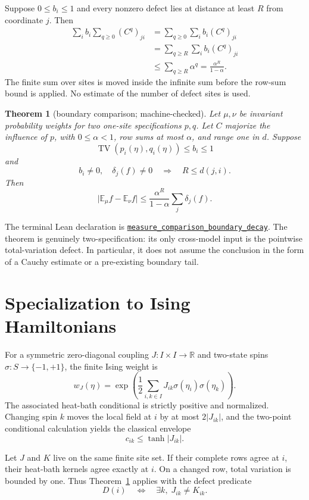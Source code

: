 \documentclass[11pt]{article}
\newtheorem{theorem}{Theorem}[section]
\theoremstyle{definition}
\newcommand{\R}{\mathbb R}
\newcommand{\E}{\mathbb E}
\newcommand{\TV}{\operatorname{TV}}
\newcommand{\abs}[1]{\lvert #1\rvert}
\newcommand{\sourceanchor}{f587b35001f4ae87c7fe0383662864df6bc9a1c0}
\newcommand{\leanline}[3]{%
  \href{https://github.com/lluiseriksson/THE-ERIKSSON-PROGRAMME/blob/\sourceanchor/YangMills/OS/#1.lean\#L#2}{\nolinkurl{#3}}}
\begin{document}
Suppose $0\le b_i\le1$ and every nonzero defect lies at distance at least $R$
from coordinate $j$.  Then
\begin{align*}
  \sum_i b_i\sum_{q\ge0}(C^q)_{ji}
  &=\sum_{q\ge0}\sum_i b_i(C^q)_{ji}\\
  &=\sum_{q\ge R}\sum_i b_i(C^q)_{ji}\\
  &\le\sum_{q\ge R}\alpha^q
   =\frac{\alpha^R}{1-\alpha}.
\end{align*}
The finite sum over sites is moved inside the infinite sum before the row-sum
bound is applied.  No estimate of the number of defect sites is used.

\begin{theorem}[boundary comparison; machine-checked]
\label{thm:abstract-boundary}
Let $\mu,\nu$ be invariant probability weights for two one-site
specifications $p,q$.  Let $C$ majorize the influence of $p$, with
$0\le\alpha<1$, row sums at most $\alpha$, and range one in $d$.  Suppose
\[
  \TV(p_i(\eta),q_i(\eta))\le b_i\le1
\]
and
\[
  b_i\ne0,\quad\delta_j(f)\ne0
  \quad\Longrightarrow\quad R\le d(j,i).
\]
Then
\[
  \abs{\E_\mu f-\E_\nu f}
  \le\frac{\alpha^R}{1-\alpha}\sum_j\delta_j(f).
\]
\end{theorem}

The terminal Lean declaration is
\leanline{DobrushinMeasureComparison}{488}{measure_comparison_boundary_decay}.
The theorem is genuinely two-specification: its only cross-model input is the
pointwise total-variation defect.  In particular, it does not assume the
conclusion in the form of a Cauchy estimate or a pre-existing boundary tail.

\section{Specialization to Ising Hamiltonians}

For a symmetric zero-diagonal coupling $J:I\times I\to\R$ and two-state spins
$\sigma:S\to\{-1,+1\}$, the finite Ising weight is
\[
  w_J(\eta)=\exp\!\left(
    \frac12\sum_{i,k\in I}J_{ik}\sigma(\eta_i)\sigma(\eta_k)
  \right).
\]
The associated heat-bath conditional is strictly positive and normalized.
Changing spin $k$ moves the local field at $i$ by at most $2\abs{J_{ik}}$, and
the two-point conditional calculation yields the classical envelope
\[
  c_{ik}\le\tanh\abs{J_{ik}}.
\]

Let $J$ and $K$ live on the same finite site set.  If their complete rows agree
at $i$, their heat-bath kernels agree exactly at $i$.  On a changed row, total
variation is bounded by one.  Thus Theorem~\ref{thm:abstract-boundary} applies
with the defect predicate
\[
  D(i)\quad\Longleftrightarrow\quad
  \exists k,\;J_{ik}\ne K_{ik}.
\]
\end{document}
